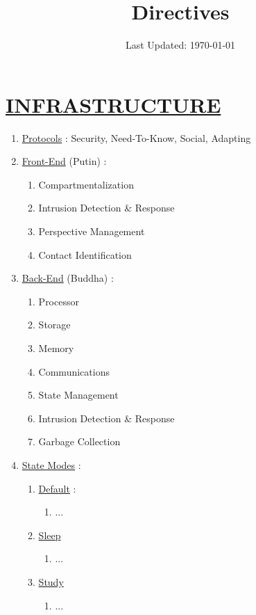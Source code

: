 \documentclass[11pt]{article}
\title{	
	\normalfont \normalsize 
	\huge Directives
}
\date{Last Updated: \normalsize\today}
\begin{document}
\maketitle
\section*{\ul{INFRASTRUCTURE}}
\begin{enumerate}
	\item[] \ul{Protocols} : Security, Need-To-Know, Social, Adapting
	
	\item[] \ul{Front-End} (Putin) :
	\begin{enumerate}
		\item[] Compartmentalization
		\item[] Intrusion Detection \& Response
		\item[] Perspective Management
		\item[] Contact Identification
	\end{enumerate}

	\item[] \ul{Back-End} (Buddha) :
	\begin{enumerate}
		\item[] Processor
		\item[] Storage
		\item[] Memory
		\item[] Communications
		\item[] State Management
		\item[] Intrusion Detection \& Response
		\item[] Garbage Collection
	\end{enumerate}

	\item[] \ul{State Modes} :
	\begin{enumerate}
		\item[] \ul{Default} :
		\begin{enumerate}
			\item[] ...
		\end{enumerate}
	
		\item[] \ul{Sleep}
		\begin{enumerate}
			\item[] ...
		\end{enumerate}

		\item[] \ul{Study}
		\begin{enumerate}
			\item[] ...
		\end{enumerate}
	

\end{enumerate}
\end{enumerate}
\end{document}
